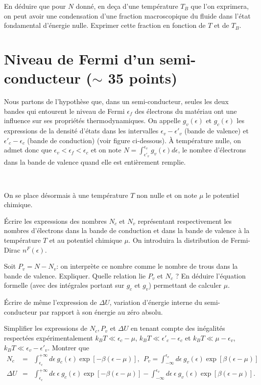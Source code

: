 \documentclass[utf8, 11pt]{feuille}
\begin{document}
\question En déduire que pour $N$ donné, en deça d'une température $T_B$ que l'on exprimera, on peut avoir une condensation d'une fraction macroscopique du fluide dans l'état fondamental d'énergie nulle. Exprimer cette fraction en fonction de $T$ et de $T_B$.


\section{Niveau de Fermi d'un semi-conducteur ($\sim$ 35 points)}
Nous partons de l'hypothèse que, dans un semi-conducteur, seules les deux bandes qui entourent le niveau de Fermi $\epsilon_f$ des électrons du matériau ont une influence sur ses propriétés thermodynamiques. On appelle $g_v(\epsilon)$ et $g_c(\epsilon)$ les expressions de la densité d'états dans les intervalles $\epsilon_v-\epsilon'_v$ (bande de valence) et 
$\epsilon'_c-\epsilon_c$ (bande de conduction) (voir figure ci-dessous). \`A température nulle, on admet donc que $\epsilon_v < \epsilon_f < \epsilon_c$ et on note $N=\int_{\epsilon'_v}^{\epsilon_v} g_v(\epsilon) d\epsilon$, le nombre d'électrons dans la bande de valence quand elle est entièrement remplie.

\ 

On se place désormais à une température $T$ non nulle et on note $\mu$ le potentiel chimique.


\question \'Ecrire les expressions des nombres $N_c$ et $N_v$ représentant respectivement les nombres d'électrons dans la bande de conduction et dans la bande de valence à la température $T$ et au potentiel chimique $\mu$. On introduira la distribution de Fermi-Dirac $n^F(\epsilon)$.

\question Soit $P_v=N-N_v$: on interprète ce nombre comme le nombre de trous dans la bande de valence. Expliquer. Quelle relation lie $P_v$ et $N_c$ ? En déduire l'équation formelle (avec des intégrales portant sur $g_c$ et $g_v$) permettant de calculer $\mu$.

\question \'Ecrire de même l'expression de $\Delta U$, variation d'énergie interne du semi-conducteur par rapport à son énergie au zéro absolu. 

\question Simplifier les expressions de $N_c,P_v$ et $\Delta U$ en tenant compte des inégalités respectées expérimentalement $k_B T \ll \epsilon_c - \mu $, $k_B T \ll \epsilon'_c-\epsilon_c$  et $k_B T \ll \mu - \epsilon_v$, $k_B T \ll \epsilon_v-\epsilon'_v$. 
Montrer que 
\begin{eqnarray}
N_c &=&  \int_{\epsilon_c}^{+\infty} d\epsilon \ g_c(\epsilon) \exp[-\beta(\epsilon-\mu)], \ \ P_v = \int^{\epsilon_v}_{-\infty} d\epsilon \ g_v(\epsilon) \exp[\beta(\epsilon-\mu)] \nonumber \\
\Delta U &=& \int_{\epsilon_c}^{+\infty} d\epsilon \ \epsilon \ g_c(\epsilon) \exp[-\beta(\epsilon-\mu)]-\int^{\epsilon_v}_{-\infty} d\epsilon \ \epsilon \ g_v(\epsilon) \exp[\beta(\epsilon-\mu)]. \nonumber
\end{eqnarray}
\end{document}
